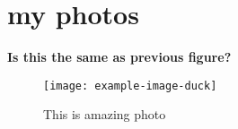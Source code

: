 \documentclass[11pt]{beamer}
\begin{document}
\section{my photos}
\begin{frame}
\footnotesize\textbf{Is this the same as previous figure?} 
\begin{figure}
\caption{This is amazing photo}
\texttt{[image: example-image-duck]}
\end{figure}
\end{frame}
\end{document}
